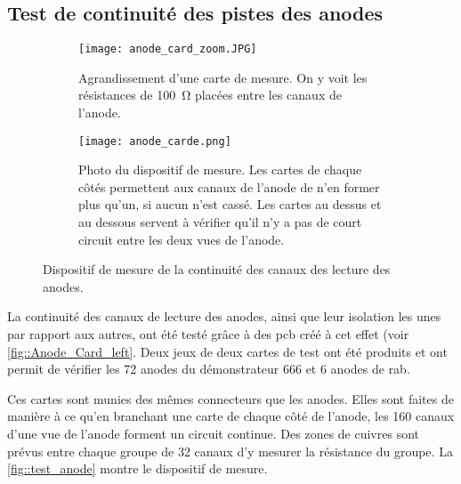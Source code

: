         \subsection{Test de continuité des pistes des anodes}\label{sec::test_anode}
            \begin{figure}
                \begin{subfigure}[t]{0.48\textwidth}
                    \texttt{[image: anode\_card\_zoom.JPG]}
                    \caption{Agrandissement d'une carte de mesure. On y voit les résistances de \SI{100}{\ohm} placées entre les canaux de l'anode.}
                    \label{fig:anode_card_zoom}
                \end{subfigure}
                \hfill
                \begin{subfigure}[t]{0.48\textwidth}
                    \texttt{[image: anode\_carde.png]}
                    \caption{Photo du dispositif de mesure. Les cartes de chaque côtés permettent aux  canaux de l'anode de n'en former plus qu'un, si aucun n'est cassé. Les cartes au dessus et au dessous servent à vérifier qu'il n'y a pas de court circuit entre les deux vues de l'anode.}
                    \label{fig:anode_card}
                \end{subfigure}
                \caption[Dispositif de mesure de la continuité des canaux des lecture des anodes.]{Dispositif de mesure de la continuité des canaux des lecture des anodes.}
                \label{fig::test_anode}
            \end{figure}
            La continuité des canaux de lecture des anodes, ainsi que leur isolation les unes par rapport aux autres, ont été testé grâce à des \gls{pcb} créé à cet effet (voir \autoref{fig::Anode_Card_left}. Deux jeux de deux cartes de test ont été produits et ont permit de vérifier les 72 anodes du démonstrateur 666 et 6 anodes de rab.
            
            Ces cartes sont munies des mêmes connecteurs que les anodes. Elles sont faites de manière à ce qu'en branchant une carte de chaque côté de l'anode, les 160 canaux d'une vue de l'anode forment un circuit continue. Des zones de cuivres sont prévus entre chaque groupe de 32 canaux d'y mesurer la résistance du groupe. La \autoref{fig::test_anode} montre le dispositif de mesure.

